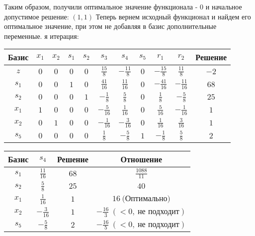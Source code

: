 \documentclass{article}%
\begin{document}
\begin{flushleft}
\begin{tabular}{|c|ccccccccc|c|}
\hline%
\end{tabular}%
\newline%
\newline%
Таким образом, получили оптимальное значение функционала {-} 0 и начальное допустимое решение: %
$(1, 1)$%
\newline%
Теперь вернем исходный функционал и найдем его оптимальное значение, при этом не добавляя в базис дополнительные переменные.%
я итерация: %
\newline%
\newline%
\renewcommand{\arraystretch}{1.3}%
\begin{tabular}{|c|ccccccccc|c|}%
\hline%
Базис&$x_{1}$&$x_{2}$&$s_{1}$&$s_{2}$&$s_{3}$&$s_{4}$&$s_{5}$&$r_{1}$&$r_{2}$&Решение\\%
\hline%
$z$&$0$&$0$&$0$&$0$&$\frac{15}{8}$&$-\frac{11}{8}$&$0$&$-\frac{15}{8}$&$\frac{11}{8}$&$-2$\\%
\hline%
$s_{1}$&$0$&$0$&$1$&$0$&$\frac{41}{16}$&$\frac{11}{16}$&$0$&$-\frac{41}{16}$&$-\frac{11}{16}$&$68$\\%
$s_{2}$&$0$&$0$&$0$&$1$&$-\frac{1}{8}$&$\frac{5}{8}$&$0$&$\frac{1}{8}$&$-\frac{5}{8}$&$25$\\%
$x_{1}$&$1$&$0$&$0$&$0$&$-\frac{5}{16}$&$\frac{1}{16}$&$0$&$\frac{5}{16}$&$-\frac{1}{16}$&$1$\\%
$x_{2}$&$0$&$1$&$0$&$0$&$-\frac{1}{16}$&$-\frac{3}{16}$&$0$&$\frac{1}{16}$&$\frac{3}{16}$&$1$\\%
$s_{5}$&$0$&$0$&$0$&$0$&$\frac{1}{8}$&$-\frac{5}{8}$&$1$&$-\frac{1}{8}$&$\frac{5}{8}$&$2$\\%
\hline%
\end{tabular}%
\newline%
\newline%
\newline%
\begin{tabular}{|cccc|}%
\hline%
Базис&$s_{4}$&Решение&Отношение\\%
\hline%
$s_{1}$&$\frac{11}{16}$&$68$&$\frac{1088}{11}$\\%
$s_{2}$&$\frac{5}{8}$&$25$&$40$\\%
$x_{1}$&$\frac{1}{16}$&$1$&$16\: \text{(Оптимально)}$\\%
$x_{2}$&$-\frac{3}{16}$&$1$&$-\frac{16}{3}\: (< 0, \: \text{не подходит})$\\%
$s_{5}$&$-\frac{5}{8}$&$2$&$-\frac{16}{5}\: (< 0, \: \text{не подходит})$\\%
\hline%
\end{tabular}%

\end{flushleft}
\end{document}
